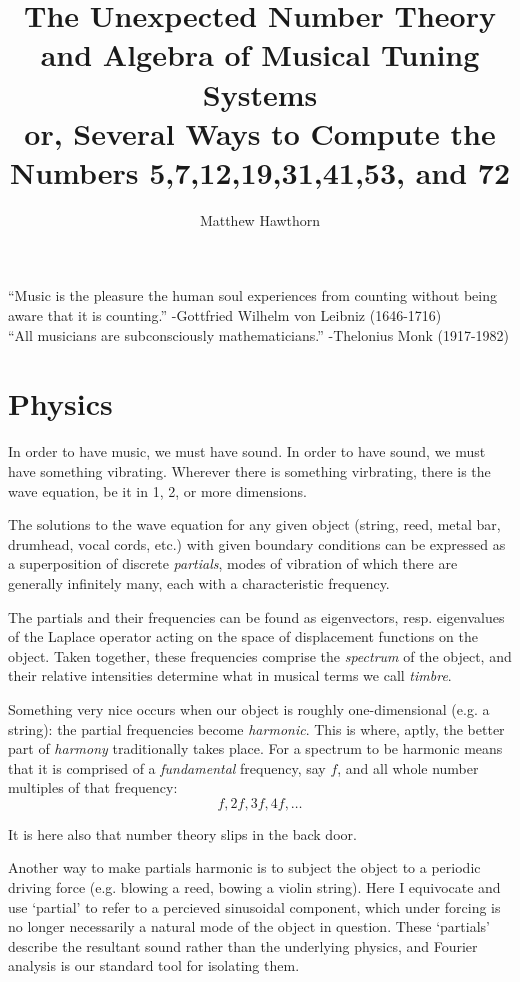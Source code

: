 \documentclass[12pt]{article}
\begin{document}
\title{The Unexpected Number Theory and Algebra of Musical Tuning Systems
	\\ \small{or, Several Ways to Compute the Numbers 5,7,12,19,31,41,53, and 72}}
\date{}
\author{Matthew Hawthorn}
\maketitle
	
``Music is the pleasure the human soul experiences from counting without being aware that it is counting.'' -Gottfried Wilhelm von Leibniz (1646-1716)
\\
		
``All musicians are subconsciously mathematicians.'' -Thelonius Monk (1917-1982)

\section{Physics}
\par
In order to have music, we must have sound.  In order to have sound, we must have something vibrating.  Wherever there is something virbrating, there is the wave equation, be it in 1, 2, or more dimensions.\\
\par
The solutions to the wave equation for any given object (string, reed, metal bar, drumhead, vocal cords, etc.) with given boundary conditions can be expressed as a superposition of discrete \emph{partials}, modes of vibration of which there are generally infinitely many, each with a characteristic frequency.\\
\par 
The partials and their frequencies can be found as eigenvectors, resp. eigenvalues of the Laplace operator acting on the space of displacement functions on the object.  Taken together, these frequencies comprise the \emph{spectrum} of the object, and their relative intensities determine what in musical terms we call \emph{timbre}.\\
\par
Something very nice occurs when our object is roughly one-dimensional (e.g. a string): the partial frequencies become \emph{harmonic}.  This is where, aptly, the better part of \emph{harmony} traditionally takes place.  For a spectrum to be harmonic means that it is comprised of a \emph{fundamental} frequency, say $f$, and all whole number multiples of that frequency:
\[ f,2f,3f,4f,\ldots \]

It is here also that number theory slips in the back door.  
\\ \par
Another way to make partials harmonic is to subject the object to a periodic driving force (e.g. blowing a reed, bowing a violin string).  Here I equivocate and use `partial' to refer to a percieved sinusoidal component, which under forcing is no longer necessarily a natural mode of the object in question.  These `partials' describe the resultant sound rather than the underlying physics, and Fourier analysis is our standard tool for isolating them.
\end{document}
